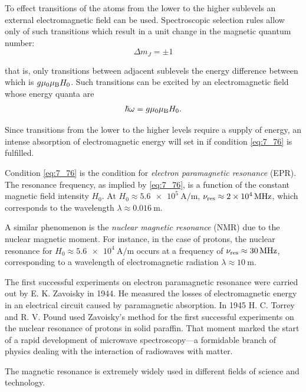 To effect transitions of the atoms from the lower to the higher sublevels an external electromagnetic field can be used. Spectroscopic selection rules allow only of such transitions which result in a unit change in the magnetic quantum number:
\begin{equation}\label{eq:7_75}
    \Delta{m_J} = \pm 1
\end{equation}

\noindent
that is, only transitions between adjacent sublevels the energy difference between which is $g \mu_0 \mu_{\text{B}} H_0$. Such transitions can be excited by
an electromagnetic field whose energy quanta are
\begin{equation}\label{eq:7_76}
    \hslash\omega = g \mu_0 \mu_{\text{B}} H_0.
\end{equation}

Since transitions from the lower to the higher levels require a supply of energy, an intense absorption of electromagnetic energy will set in if condition \eqref{eq:7_76} is fulfilled.

Condition \eqref{eq:7_76} is the condition for \textit{electron paramagnetic resonance} (EPR). The resonance frequency, as implied by \eqref{eq:7_76}, is a function of the constant magnetic field intensity $H_0$. At $H_0\approx\SI{5.6e5}{\ampere\per\metre}$, $\nu_{\text{res}}\approx\SI{2e4}{\mega\hertz}$, which corresponds to the wavelength $\lambda\approx\SI{0.016}{\metre}$.

A similar phenomenon is the \textit{nuclear magnetic resonance} (NMR) due to the nuclear magnetic moment. For instance, in the case of protons, the nuclear resonance for $H_0\approx\SI{5.6e4}{\ampere\per\metre}$ occurs at a frequency of $\nu_{\text{res}}\approx\SI{30}{\mega\hertz}$, corresponding to a wavelength of electromagnetic radiation $\lambda\approx\SI{10}{\metre}$.

The first successful experiments on electron paramagnetic resonance were carried out by E. K. Zavoisky in 1944. He measured the losses of electromagnetic energy in an electrical circuit caused by paramagnetic absorption. In 1945 H. C. Torrey and R. V. Pound used Zavoisky's method for the first successful experiments on the nuclear resonance of protons in solid paraffin. That moment marked the start of a rapid development of microwave spectroscopy---a formidable branch of physics dealing with the interaction of radiowaves with matter.

The magnetic resonance is extremely widely used in different fields of science and technology.

